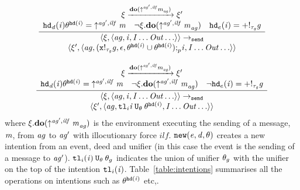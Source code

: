 \begin{equation}
    \frac{
  \begin{array}{c}
      \xi \xrightarrow{\mathrm{\mathbf{do}}(\mathit{\uparrow^{\mathit{ag}',ilf}\mathit{m}}_{\mathit{ag}})} \xi' \\
\mathit{{\tt hd}_d}(\mathit{i})\theta^{{\tt hd}(\mathit{i})} = 
\mathit{\uparrow^{\mathit{ag}',ilf}\mathit{m}}
\quad \neg \xi.\mathrm{\mathbf{do}}(\mathit{\uparrow^{\mathit{ag}',ilf}\mathit{m}}_{\mathit{ag}})
\quad {\tt hd}_e(\mathit{i}) = +!_{\mathit{\tau_{\mathit{g}}}}\mathit{g}
\end{array}
}{
\begin{array}{c}
\langle \xi, \langle \mathit{ag},  \mathit{i}, \mathit{I} \ldots \mathit{Out} \ldots \rangle \rangle \rightarrow_{\tt send} \\
\langle \xi', \langle \mathit{ag}, 
(\mathit{\mathtt{x}!_{\mathit{\tau_{\mathit{g}}}}\mathit{g}}, \epsilon,
\theta^{{\tt hd}(\mathit{i})} \cup \theta^{{\tt hd}(\mathit{i})}) {\tt ;}_p
\mathit{i},  
\mathit{I} \ldots \mathit{Out} \ldots \rangle \rangle
\end{array}
}
\end{equation}

\begin{equation}
  \frac{
    \begin{array}{c}
    \xi \xrightarrow{\mathrm{\mathbf{do}}(\mathit{\uparrow^{\mathit{ag}',ilf}\mathit{m}}_{\mathit{ag}})} \xi' \\
\mathit{{\tt hd}_d}(\mathit{i})\theta^{{\tt hd}(\mathit{i})} = 
\mathit{\uparrow^{\mathit{ag}',ilf}\mathit{m}}
\quad \neg \xi.\mathrm{\mathbf{do}}(\mathit{\uparrow^{\mathit{ag}',ilf}\mathit{m}}_{\mathit{ag}})
\quad \neg {\tt hd}_e(\mathit{i}) = +!_{\mathit{\tau_{\mathit{g}}}}\mathit{g}
\end{array}
}{
\begin{array}{c}
\langle \xi, \langle \mathit{ag},  \mathit{i}, \mathit{I} \ldots \mathit{Out} \ldots \rangle \rangle \rightarrow_{\tt send} \\
\langle \xi', \langle \mathit{ag}, 
{\tt tl}_i{\mathit{i}} \: {\tt U}_{\theta} \: \theta^{{\tt hd}(\mathit{i})},
 \mathit{I} 
\ldots \mathit{Out} \ldots \rangle \rangle
\end{array}
}
\end{equation}
where $\xi.\mathrm{\mathbf{do}}(\mathit{\uparrow^{\mathit{ag}',ilf}\mathit{m}}_{\mathit{ag}})$ is the environment executing the sending of a message, $\mathit{m}$, from $\mathit{ag}$ to $\mathit{ag}'$ with illocutionary force $\mathit{ilf}$.
${\tt new}(\mathit{e}, \mathit{d}, \theta)$ creates a new intention from an event, deed and unifier (in this case the event is the sending of a message to $\mathit{ag}'$).
${\tt tl}_i(\mathit{i}) \: {\tt U}_{\theta} \: \theta_g$ indicates the union of unifier $\theta_g$ with the unifier on the top of the intention ${\tt tl}_i(\mathit{i})$.
Table~\ref{table:intentions} summarises all the operations on intentions such as $\theta^{{\tt hd}(\mathit{i})}$ etc,.

